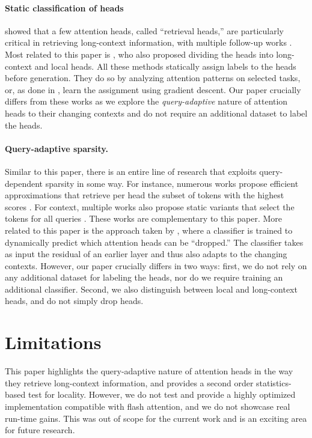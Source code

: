 \paragraph{Static classification of heads } 
\citet{wu2024retrieval} showed that a few attention heads, called ``retrieval heads,'' are particularly critical in retrieving long-context information, with multiple follow-up works \citep{tang2024razorattention,hong2024token,xiao2024duoattention,cai2024pyramidkv,he2025task}. Most related to this paper is \citet{xiao2024duoattention}, who also proposed dividing the heads into long-context and local heads. All these methods statically assign labels to the heads before generation. They do so by analyzing attention patterns on selected tasks, or, as done in \citep{xiao2024duoattention}, learn the assignment using gradient descent. Our paper crucially differs from these works as we explore the \textit{query-adaptive} nature of attention heads to their changing contexts and do not require an additional dataset to label the heads.

\paragraph{Query-adaptive sparsity.}
Similar to this paper, there is an entire line of research that exploits query-dependent sparsity in some way. For instance, numerous works propose efficient approximations that retrieve per head the subset of tokens with the highest scores \citep{tang2024quest,ribar2023sparq,chen2021scatterbrain,sun2024shadowkv}. For context, multiple works also propose static variants that select the tokens for all queries \citep{zhang2023h2o,li2024snapkv,oren2024transformers}. These works are complementary to this paper. More related to this paper is the approach taken by \citep{liu2023deja,akhauri2024shadowllm}, where a classifier is trained to dynamically predict which attention heads can be ``dropped.'' The classifier takes as input the residual of an earlier layer and thus also adapts to the changing contexts. However, our paper crucially differs in two ways: first, we do not rely on any additional dataset for labeling the heads, nor do we require training an additional classifier. Second, we also distinguish between local and long-context heads, and do not simply drop heads.






\section{Limitations}
This paper highlights the query-adaptive nature of attention heads in the way they retrieve long-context information, and provides a second order statistics-based test for locality. However, we do not test and provide a highly optimized implementation compatible with flash attention, and we do not showcase real run-time gains. This was out of scope for the current work and is an exciting area for future research.






